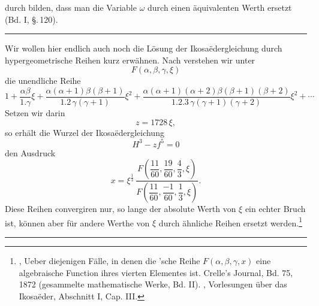 durch bilden, dass man die Variable $\omega$ durch einen äquivalenten Werth ersetzt (Bd. I, \S.\,120).

\begin{center}
\rule{0.25\linewidth}{0.4pt}
\end{center}

Wir wollen hier endlich auch noch die Lösung der Ikosaëdergleichung durch hypergeometrische Reihen kurz erwähnen. Nach  verstehen wir unter
\[
F(\alpha, \beta, \gamma, \xi)
\]
die unendliche Reihe
\[
1 + \frac{\alpha\beta}{1.\gamma}\xi + \frac{\alpha(\alpha+1)\beta(\beta+1)}{1.2\,\gamma(\gamma+1)}\xi^2 + \frac{\alpha(\alpha+1)(\alpha+2)\beta(\beta+1)(\beta+2)}{1.2.3\,\gamma(\gamma+1)(\gamma+2)}\xi^2 + \cdots
\]
Setzen wir darin
\[
z = 1728\,\xi,
\]
so erhält die Wurzel der Ikosaëdergleichung
\[
H^3 - zf^5 = 0
\]
den Ausdruck
\[
x = \xi^{\frac{1}{3}}\,\frac{F\left(\dfrac{11}{60}, \dfrac{19}{60}, \dfrac{4}{3}, \xi\right)}{F\left(\dfrac{11}{60}, \dfrac{-1}{60}, \dfrac{1}{3}, \xi\right)}.
\]
Diese Reihen convergiren nur, so lange der absolute Werth von $\xi$ ein echter Bruch ist, können aber für andere Werthe von $\xi$ durch ähnliche Reihen ersetzt werden.\footnote{, \glqq{}Ueber diejenigen Fälle, in denen die 'sche Reihe $F(\alpha,\beta,\gamma,x)$ eine algebraische Function ihres vierten Elementes ist\grqq{}. Crelle's Journal, Bd. 75, 1872 (gesammelte mathematische Werke, Bd. II). , Vorlesungen über das Ikosaëder, Abschnitt I, Cap. III.}

\begin{center}
\rule{0.25\linewidth}{0.4pt}
\end{center}
